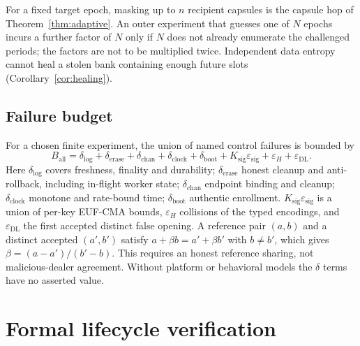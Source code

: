 \documentclass[pdflatex,sn-mathphys-num]{sn-jnl}
\theoremstyle{plain}
\theoremstyle{definition}
\begin{document}
For a fixed target epoch, masking up to $n$ recipient capsules is the capsule hop of Theorem~\ref{thm:adaptive}. An outer experiment that guesses one of $N$ epochs incurs a further factor of $N$ only if $N$ does not already enumerate the challenged periods; the factors are not to be multiplied twice. Independent data entropy cannot heal a stolen bank containing enough future slots (Corollary~\ref{cor:healing}).

\subsection{Failure budget}
For a chosen finite experiment, the union of named control failures is bounded by
\begin{equation}\label{eq:budget}
 B_{\mathrm{all}}=\delta_{\mathrm{log}}+\delta_{\mathrm{erase}}+\delta_{\mathrm{chan}}+\delta_{\mathrm{clock}}+\delta_{\mathrm{boot}}+K_{\mathrm{sig}}\varepsilon_{\mathrm{sig}}+\varepsilon_H+\varepsilon_{\mathrm{DL}}.
\end{equation}
Here $\delta_{\mathrm{log}}$ covers freshness, finality and durability; $\delta_{\mathrm{erase}}$ honest cleanup and anti-rollback, including in-flight worker state; $\delta_{\mathrm{chan}}$ endpoint binding and cleanup; $\delta_{\mathrm{clock}}$ monotone and rate-bound time; $\delta_{\mathrm{boot}}$ authentic enrollment. $K_{\mathrm{sig}}\varepsilon_{\mathrm{sig}}$ is a union of per-key EUF-CMA bounds, $\varepsilon_H$ collisions of the typed encodings, and $\varepsilon_{\mathrm{DL}}$ the first accepted distinct false opening. A reference pair $(a,b)$ and a distinct accepted $(a',b')$ satisfy $a+\beta b=a'+\beta b'$ with $b\ne b'$, which gives $\beta=(a-a')/(b'-b)$. This requires an honest reference sharing, not malicious-dealer agreement. Without platform or behavioral models the $\delta$ terms have no asserted value.


\section{Formal lifecycle verification}\label{sec:formal}
\end{document}
